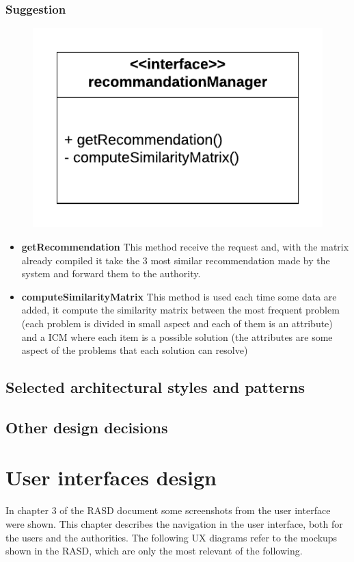 \documentclass[12pt,a4paper]{report}
\begin{document}
			\subsection{Suggestion}
				\begin{figure}[H]
						\includegraphics [center]{recommendationInterface}
						\label{fig: interfaces}
				\end{figure}
				\begin{itemize}
					\item \textbf{getRecommendation} This method receive the request and, with the matrix already
						compiled it take the 3 most similar recommendation made by the system and forward them to the
						authority.
					\item \textbf{computeSimilarityMatrix} This method is used each time some data are added, it compute
					the similarity matrix between the most frequent problem (each problem is divided in small aspect and
					each of them is an attribute) and a ICM where each item is a possible solution (the attributes are some
					aspect of the problems that each solution can resolve)
				\end{itemize}
		\section{Selected architectural styles and patterns}
		\section{Other design decisions}

	\chapter{User interfaces design}
	In chapter 3 of the RASD document some screenshots from the user interface were shown. This chapter describes the navigation in the user interface, both for the users and the authorities. The following UX diagrams refer to the mockups shown in the RASD, which are only the most relevant of the following.
\end{document}
